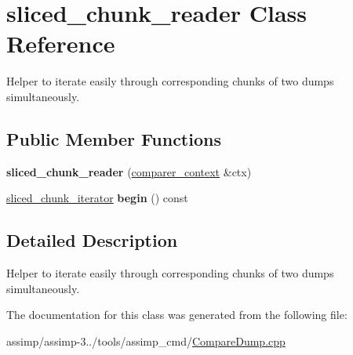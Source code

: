 \hypertarget{classsliced__chunk__reader}{\section{sliced\+\_\+chunk\+\_\+reader Class Reference}
\label{classsliced__chunk__reader}
}


Helper to iterate easily through corresponding chunks of two dumps simultaneously.  


\subsection*{Public Member Functions}
\begin{DoxyCompactItemize}
\item 
\hypertarget{classsliced__chunk__reader_a3f3beea9fb348cbefd2357a682aa2ded}{{\bfseries sliced\+\_\+chunk\+\_\+reader} (\hyperlink{classcomparer__context}{comparer\+\_\+context} \&ctx)}\label{classsliced__chunk__reader_a3f3beea9fb348cbefd2357a682aa2ded}

\item 
\hypertarget{classsliced__chunk__reader_a28adbc922fab74a9a566d89e3db5c4e7}{\hyperlink{classsliced__chunk__iterator}{sliced\+\_\+chunk\+\_\+iterator} {\bfseries begin} () const }\label{classsliced__chunk__reader_a28adbc922fab74a9a566d89e3db5c4e7}

\end{DoxyCompactItemize}


\subsection{Detailed Description}
Helper to iterate easily through corresponding chunks of two dumps simultaneously. 

The documentation for this class was generated from the following file\+:\begin{DoxyCompactItemize}
\item 
assimp/assimp-\/3../tools/assimp\+\_\+cmd/\hyperlink{_compare_dump_8cpp}{Compare\+Dump.\+cpp}\end{DoxyCompactItemize}
